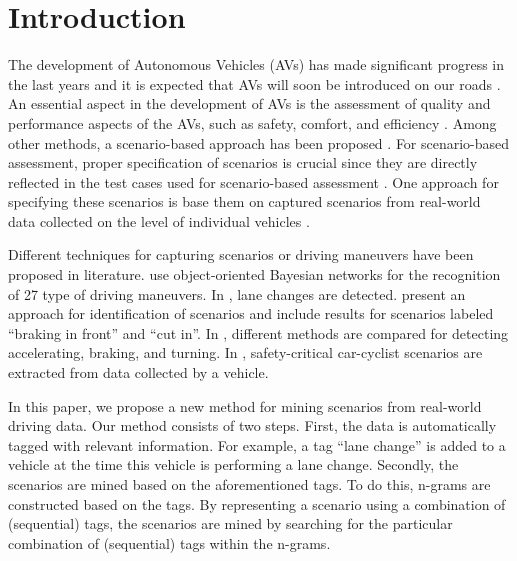 \section{Introduction}
\label{sec:introduction}

\cstarta
The development of Autonomous Vehicles (AVs) has made significant progress in the last years and it is expected that AVs will soon be introduced on our roads \autocite{bimbraw2015autonomous, madni2018autonomous}. 
An essential aspect in the development of AVs is the assessment of quality and performance aspects of the AVs, such as safety, comfort, and efficiency \autocite{bengler2014threedecades, stellet2015taxonomy}. 
Among other methods, a scenario-based approach has been proposed \autocite{elrofai2018scenario, putz2017pegasus}. 
For scenario-based assessment, proper specification of scenarios is crucial since they are directly reflected in the test cases used for scenario-based assessment \autocite{stellet2015taxonomy}. 
One approach for specifying these scenarios is base them on captured scenarios from real-world data collected on the level of individual vehicles \autocite{elrofai2018scenario, putz2017pegasus, roesener2016scenariobased, deGelder2017assessment}. 

Different techniques for capturing scenarios or driving maneuvers have been proposed in literature. 
\textcite{kasper2012oobayesnetworks} use object-oriented Bayesian networks for the recognition of 27 type of driving maneuvers. 
In \autocite{krajewski2018highD, schlechtriemen2015lanechange}, lane changes are detected. \textcite{paardekooper2019dataset6000km} present an approach for identification of scenarios and include results for scenarios labeled ``braking in front'' and ``cut in''. 
In \cite{xie2017driving}, different methods are compared for detecting accelerating, braking, and turning.
In \autocite{cara2015carcyclist}, safety-critical car-cyclist scenarios are extracted from data collected by a vehicle.

In this paper, we propose a new method for mining scenarios from real-world driving data. 
Our method consists of two steps. First, the data is automatically tagged with relevant information. For example, a tag ``lane change'' is added to a vehicle at the time this vehicle is performing a lane change. Secondly, the scenarios are mined based on the aforementioned tags. To do this, n-grams are constructed based on the tags. By representing a scenario using a combination of (sequential) tags, the scenarios are mined by searching for the particular combination of (sequential) tags within the n-grams.

